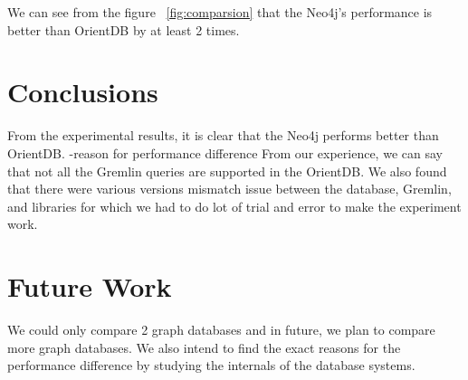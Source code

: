We can see from the figure ~\ref{fig:comparsion} that the Neo4j's performance is better than OrientDB by at least 2 times.


\section{Conclusions}
From the experimental results, it is clear that the Neo4j performs better than OrientDB.
-reason for performance difference
From our experience, we can say that not all the Gremlin queries are supported in the OrientDB. We also found that there were various versions mismatch issue between the database, Gremlin, and libraries for which we had to do lot of trial and error to make the experiment work.

\section{Future Work}
We could only compare 2 graph databases and in future, we plan to compare more graph databases. We also intend to find the exact reasons for the performance difference by studying the internals of the database systems.

